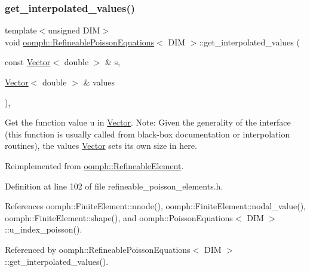 \subsubsection{\texorpdfstring{get\+\_\+interpolated\+\_\+values()}{get\_interpolated\_values()}\hspace{0.1cm}{\footnotesize\ttfamily [1/2]}}
{\footnotesize\ttfamily template$<$unsigned D\+IM$>$ \\
void \hyperlink{classoomph_1_1RefineablePoissonEquations}{oomph\+::\+Refineable\+Poisson\+Equations}$<$ D\+IM $>$\+::get\+\_\+interpolated\+\_\+values (\begin{DoxyParamCaption}\item[{const \hyperlink{classoomph_1_1Vector}{Vector}$<$ double $>$ \&}]{s,  }\item[{\hyperlink{classoomph_1_1Vector}{Vector}$<$ double $>$ \&}]{values }\end{DoxyParamCaption})\hspace{0.3cm}{\ttfamily [inline]}, {\ttfamily [virtual]}}



Get the function value u in \hyperlink{classoomph_1_1Vector}{Vector}. Note\+: Given the generality of the interface (this function is usually called from black-\/box documentation or interpolation routines), the values \hyperlink{classoomph_1_1Vector}{Vector} sets its own size in here. 



Reimplemented from \hyperlink{classoomph_1_1RefineableElement_ad9a4f92880668a2373326d8306365c43}{oomph\+::\+Refineable\+Element}.



Definition at line 102 of file refineable\+\_\+poisson\+\_\+elements.\+h.



References oomph\+::\+Finite\+Element\+::nnode(), oomph\+::\+Finite\+Element\+::nodal\+\_\+value(), oomph\+::\+Finite\+Element\+::shape(), and oomph\+::\+Poisson\+Equations$<$ D\+I\+M $>$\+::u\+\_\+index\+\_\+poisson().



Referenced by oomph\+::\+Refineable\+Poisson\+Equations$<$ D\+I\+M $>$\+::get\+\_\+interpolated\+\_\+values().

\mbox{\label{classoomph_1_1RefineablePoissonEquations_affb65cdad97b93f4eff2e2f804efac02}} 
